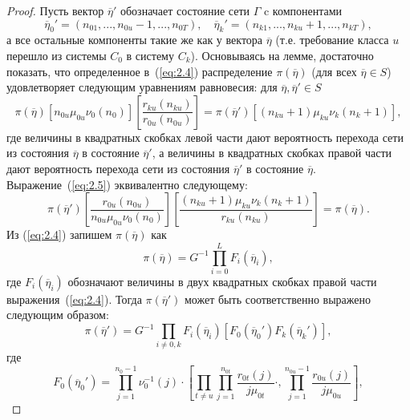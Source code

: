 \begin{proof}
 Пусть вектор $\overline{\eta}'$ обозначает состояние сети $\Gamma$ c компонентами
  \begin{equation*}
   \overline{\eta}_0 ' = (n_{01},...,n_{0u}-1,...,n_{0T}), \quad \overline{\eta}_k ' = (n_{k1},...,n_{ku}+1,...,n_{kT}),
  \end{equation*}
 а все остальные компоненты такие же как у вектора $\overline{\eta}$ (т.е. требование класса $u$ перешло из системы $C_0$ в систему $C_k$). Основываясь на лемме, достаточно показать, что определенное в~(\ref{eq:2.4}) распределение $\pi(\overline{\eta})$ (для всех $\overline{\eta} \in S$) удовлетворяет следующим уравнениям равновесия: для $\overline{\eta}, \overline{\eta} ' \in S$
 \begin{equation}
  \pi(\overline{\eta}) [n_{0u} \mu_{0u} \nu_0(n_0)] \left[ \frac{r_{ku} (n_{ku})}{r_{0u} (n_{0u}) } \right]  =
  \pi(\overline{\eta} ') [(n_{ku} + 1)\mu_{ku} \nu_k (n_k + 1)] ,
  \label{eq:2.5}
 \end{equation}
 где величины в квадратных скобках левой части дают вероятность перехода сети из состояния $\overline{\eta}$ в состояние $\overline{\eta} '$, а величины в квадратных скобках правой части дают вероятность перехода сети из состояния $\overline{\eta} '$ в состояние $\overline{\eta}$. Выражение~(\ref{eq:2.5}) эквивалентно следующему:
 \begin{equation*}
  \pi(\overline{\eta} ') \left[ \frac{r_{0u} (n_{0u})}{n_{0u} \mu_{0u} \nu_0(n_0)} \right]
  \left[ \frac{(n_{ku} + 1)\mu_{ku} \nu_k (n_k + 1)}{r_{ku} (n_{ku})} \right] = \pi(\overline{\eta}) .
  \tag{\theequation a} \label{eq:2.5a}
 \end{equation*}
 Из (\ref{eq:2.4}) запишем $\pi(\overline{\eta})$ как
 \begin{equation*}
  \pi(\overline{\eta}) = G^{-1} \prod_{i=0}^L F_i(\overline{\eta}_i) ,
 \end{equation*}
 где $F_i(\overline{\eta}_i)$ обозначают величины в двух квадратных скобках правой части выражения~(\ref{eq:2.4}). Тогда $\pi(\overline{\eta}')$ может быть соответственно выражено следующим образом:
 \begin{equation*}
  \pi(\overline{\eta} ') = G^{-1} \prod_{i \neq 0,k} F_i(\overline{\eta}_i)
  [F_0(\overline{\eta}_0 ')F_k(\overline{\eta}_k ')] ,
 \end{equation*}
 где
 \begin{equation*}
  F_0(\overline{\eta}_0 ') = \prod_{j=1}^{n_0-1} \nu_0^{-1}(j) \cdot
  \left[
  \prod_{t \neq u} \prod_{j=1}^{n_{0t}} \frac{r_{0t}(j)}{j\mu_{0t}} \cdot,
  \prod_{j=1}^{n_{0u}-1} \frac{r_{0u}(j)}{j\mu_{0u}}
  \right] ,
 \end{equation*}


\end{proof}

